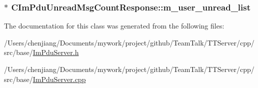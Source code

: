 \subsubsection[{m\+\_\+user\+\_\+unread\+\_\+list}]{$\ast$ C\+Im\+Pdu\+Unread\+Msg\+Count\+Response\+::m\+\_\+user\+\_\+unread\+\_\+list\hspace{0.3cm}{\ttfamily [private]}}\label{class_c_im_pdu_unread_msg_count_response_a80cc124bb9bf22717610b827e16dc588}


The documentation for this class was generated from the following files\+:\begin{DoxyCompactItemize}
\item 
/\+Users/chenjiang/\+Documents/mywork/project/github/\+Team\+Talk/\+T\+T\+Server/cpp/src/base/\hyperlink{_im_pdu_server_8h}{Im\+Pdu\+Server.\+h}\item 
/\+Users/chenjiang/\+Documents/mywork/project/github/\+Team\+Talk/\+T\+T\+Server/cpp/src/base/\hyperlink{_im_pdu_server_8cpp}{Im\+Pdu\+Server.\+cpp}\end{DoxyCompactItemize}
